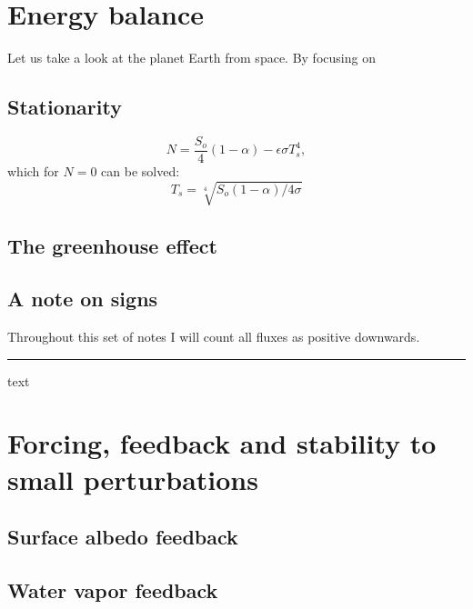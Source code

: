 \documentclass[12pt]{book}
\begin{document}

\chapter{Energy balance}
Let us take a look at the planet Earth from space. By focusing on 

\section{Stationarity}


\begin{equation}
N = \frac{S_o}{4}(1-\alpha) - \epsilon \sigma T_s^4,
\end{equation}
\noindent which for $N=0$ can be solved:
\begin{equation}
T_s = \sqrt[4]{S_o(1-\alpha)/4\sigma}
\end{equation}



\section{The greenhouse effect}

\section{A note on signs}
Throughout this set of notes I will count all fluxes as positive downwards. 

\vspace{1 cm}
{\setlength{\parindent}{0cm}
\hrule
\begin{exercise}
text
\end{exercise}
}

\chapter{Forcing, feedback and stability to small perturbations}

\section{Surface albedo feedback}
\section{Water vapor feedback}
\end{document}

